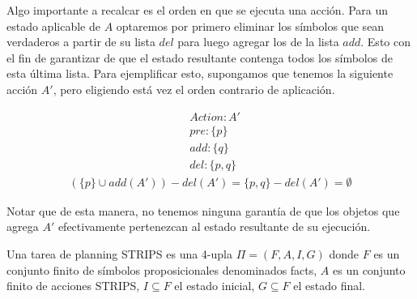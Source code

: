 Algo importante a recalcar es el orden en que se ejecuta una acción. Para un
estado aplicable de $A$ optaremos por primero eliminar los símbolos que sean
verdaderos a partir de su lista $del$ para luego agregar los de la lista $add$.
Esto con el fin de garantizar de que el estado resultante contenga todos los
símbolos de esta última lista. Para ejemplificar esto, supongamos que tenemos la
siguiente acción $A'$, pero eligiendo está vez el orden contrario de aplicación.

\begin{align*}
    & Action : A' \\
    & pre : \{ p \}\\
    & add : \{ q \}\\
    & del : \{ p, q \}
\end{align*}
\begin{align*}
    (\{p\} \cup add(A')) - del(A') = \{p, q\} - del(A') = \emptyset
\end{align*}

Notar que de esta manera, no tenemos ninguna garantía de que los objetos que
agrega $A'$ efectivamente pertenezcan al estado resultante de su ejecución.

\begin{mydef}
    Una tarea de planning STRIPS es una 4-upla $\Pi = (F, A, I, G)$ donde $F$ es
    un conjunto finito de símbolos proposicionales denominados facts, $A$ es un
    conjunto finito de acciones STRIPS, $I \subseteq F$ el estado inicial, $G
    \subseteq F$ el estado final.
\end{mydef}

